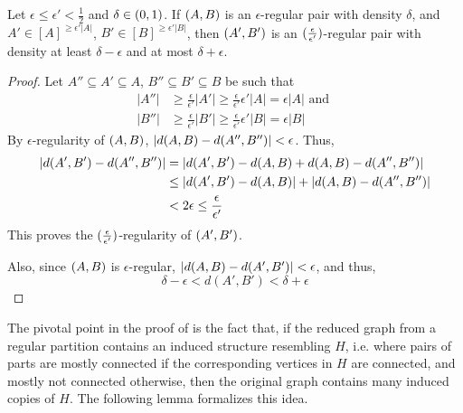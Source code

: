     \begin{lemma} \label{lem:regularity_is_transitive}
        Let $\epsilon \leq \epsilon' < \frac{1}{2}$ and $\delta \in ( 0, 1 )$.
        If $( A,B )$ is an $\epsilon$-regular pair with density $\delta$, and $A' \in [A]^{\geq \epsilon' |A|}$,
        $B' \in [B]^{\geq \epsilon' |B|}$, then $( A', B' )$ is an $( \frac{\epsilon}{\epsilon'} )$-regular
        pair with density at least $\delta - \epsilon$ and at most $\delta + \epsilon$.
        \begin{proof}
            Let $A'' \subseteq A' \subseteq A$, $B'' \subseteq B' \subseteq B$ be such that
            \begin{align*}
                |A''| & \geq \frac{\epsilon}{\epsilon'} |A'| \geq \frac{\epsilon}{\epsilon'} \epsilon' |A| = \epsilon |A|
                \text{ and } \\
                |B''| & \geq \frac{\epsilon}{\epsilon'} |B'| \geq \frac{\epsilon}{\epsilon'} \epsilon' |B| = \epsilon |B|
            \end{align*}
            By $\epsilon$-regularity of $( A,B )$, $| d(A,B) - d(A'',B'') | < \epsilon$.
            Thus,
            \begin{align*}
                | d(A',B') - d(A'',B'') |
                    & = | d(A',B') - d(A,B) + d(A,B) - d(A'',B'') | \\
                    & \leq | d(A',B') - d(A,B) | + | d(A,B) - d(A'',B'') | \\
                    & < 2 \epsilon \leq \frac{\epsilon}{\epsilon'}
            \end{align*}
            This proves the $( \frac{\epsilon}{\epsilon'} )$-regularity of $( A',B' )$.

            Also, since $( A,B )$ is $\epsilon$-regular, $| d(A,B) - d(A',B') | < \epsilon$,
            and thus,
            \[
                \delta - \epsilon < d(A',B') < \delta + \epsilon
            \]
        \end{proof}
    \end{lemma}

    The pivotal point in the proof of  is the fact that, if the
    reduced graph from a regular partition contains an induced structure resembling $H$, i.e. where pairs of parts are
    mostly connected if the corresponding vertices in $H$ are connected, and mostly not connected otherwise,
    then the original graph contains many induced copies of $H$.
    The following lemma formalizes this idea.


